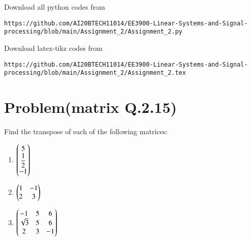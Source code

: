 \documentclass[journal,12pt,twocolumn]{IEEEtran}
\begin{document}
\maketitle
\newpage
\bigskip
\renewcommand{\thefigure}{\theenumi}
\renewcommand{\thetable}{\theenumi}
Download all python codes from 
\begin{lstlisting}
https://github.com/AI20BTECH11014/EE3900-Linear-Systems-and-Signal-processing/blob/main/Assignment_2/Assignment_2.py
\end{lstlisting}
%
Download latex-tikz codes from 
%
\begin{lstlisting}
https://github.com/AI20BTECH11014/EE3900-Linear-Systems-and-Signal-processing/blob/main/Assignment_2/Assignment_2.tex
\end{lstlisting}
\section{Problem(matrix Q.2.15)}
 Find the transpose of each of the following
matrices:
\begin{enumerate}
    \item $\begin{pmatrix}5\\ \dfrac{1}{2}\\-1\end{pmatrix}$\\
    \item $\begin{pmatrix}1&-1\\2&3\end{pmatrix}$\\
    \item $\begin{pmatrix}-1&5&6\\ \sqrt{3}&5&6\\2&3&-1\end{pmatrix}$\\
\end{enumerate}
\end{document}
